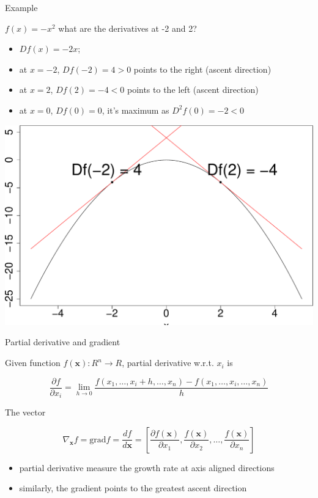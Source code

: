 \documentclass[ignorenonframetext,]{beamer}
\providecommand{\tightlist}{%
  \setlength{\itemsep}{0pt}\setlength{\parskip}{0pt}}
\newcommand{\vv}[1]{\boldsymbol{#1}}
\begin{document}
\begin{frame}{Example}
\protect\hypertarget{example-3}{}

\(f(x) = -x^2\) what are the derivatives at -2 and 2?

\begin{itemize}
\tightlist
\item
  \(Df(x) = -2x\);
\item
  at \(x=-2\), \(Df(-2)=4 >0\) points to the right (ascent direction)
\item
  at \(x=2\), \(Df(2) =-4 <0\) points to the left (ascent direction)
\item
  at \(x=0\), \(Df(0) = 0\), it's maximum as \(D^2f(0) =-2<0\) \bigskip
\end{itemize}

\begin{center}\includegraphics[width=0.6\linewidth]{math4ml_files/figure-beamer/unnamed-chunk-11-1} \end{center}

\end{frame}

\begin{frame}{Partial derivative and gradient}
\protect\hypertarget{partial-derivative-and-gradient}{}

Given function \(f(\vv{x}): R^n\rightarrow R\), partial derivative
w.r.t. \(x_i\) is

\[\frac{\partial f}{\partial x_i} = \lim_{h \rightarrow 0} \frac{f(x_1, \ldots, x_i+h, \ldots, x_n) - f(x_1, \ldots, x_i, \ldots, x_n)}{h} \]

The vector

\[\nabla_{\vv{x}}f=\text{grad} f = \frac{df}{d\vv{x}} = \left [\frac{\partial f(\vv{x})}{\partial x_1}, \frac{f(\vv{x})}{\partial x_2}, \ldots, \frac{f(\vv{x})}{\partial x_n}\right ]\]

\begin{itemize}
\tightlist
\item
  partial derivative measure the growth rate at axis aligned directions
\item
  similarly, the gradient points to the greatest ascent direction
\end{itemize}

\end{frame}
\end{document}
